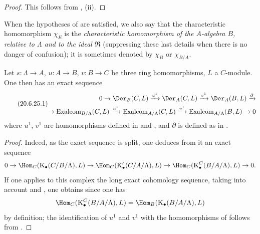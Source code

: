 \begin{proof}
This follows from , (ii).
\end{proof}

\begin{env}[20.6.24]
\label{0.20.6.24}
When the hypotheses of  are satisfied, we also say that the characteristic homomorphism $\chi_E$ is the \emph{characteristic homomorphism of the $A$-algebra $B$, relative to $\Lambda$ and to the ideal $\mathfrak{R}$} (suppressing these last details when there is no danger of confusion); it is sometimes denoted by $\chi_B$ or $\chi_{B/A}$.
\end{env}

\begin{proposition}[20.6.25]
\label{0.20.6.25}
Let $s:\Lambda\to A$, $u:A\to B$, $v:B\to C$ be three ring homomorphisms, $L$ a $C$-module.
One then has an exact sequence
\begin{equation}
\tag{20.6.25.1}
  \label{0.20.6.25.1}
\begin{split}
  0\to\Der_B(C,L)\xrightarrow{u^1}\Der_A(C,L)\xrightarrow{v^1}\Der_A(B,L)\xrightarrow{\partial} \\
  \to\operatorname{Exalcom}_{B/\Lambda}(C,L)\xrightarrow{u^1}\operatorname{Exalcom}_{A/\Lambda}(C,L)\xrightarrow{v^1}\operatorname{Exalcom}_{A/\Lambda}(B,L)\to 0
\end{split}
\end{equation}
where $u^1$, $v^1$ are homomorphisms defined in  and , and $\partial$ is defined as in .
\end{proposition}

\begin{proof}
Indeed, as the exact sequence  is split, one deduces from it an exact sequence
\[
  0\to\Hom_C(\mathrm{K}_\bullet(C/B/\Lambda),L)\to\Hom_C(\mathrm{K}'_\bullet(C/A/\Lambda),L)\to\Hom_C(\mathrm{K}^C_\bullet(B/A/\Lambda),L)\to 0.
\]
If one applies to this complex the long exact cohomology sequence, taking into account  and , one obtains  since one has
\[
  \Hom_C(\mathrm{K}^C_\bullet(B/A/\Lambda),L)=\Hom_B(\mathrm{K}_\bullet(B/A/\Lambda),L)
\]
by definition; the identification of $u^1$ and $v^1$ with the homomorphisms of  follows from .
\end{proof}

